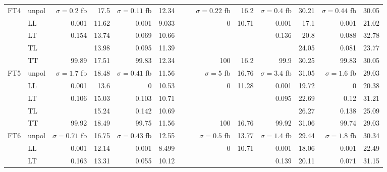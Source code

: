 \begin{table}[h]
{\begin{tabular}{llrrrrrrrrrrrr}
\midrule
\multirow{5}{*}{FT4}
 & unpol & $\sigma = \num{0.2}$ fb & \num{17.5} & $\sigma = \num{0.11}$ fb & \num{12.34} &  &  & $\sigma = \num{0.22}$ fb & \num{16.2} & $\sigma = \num{0.4}$ fb & \num{30.21} & $\sigma = \num{0.44}$ fb & \num{30.05} \\
 & LL & \num{0.001} & \num{11.62} & \num{0.001} & \num{9.033} &  &  & \num{0} & \num{10.71} & \num{0.001} & \num{17.1} & \num{0.001} & \num{21.02} \\
 & LT & \num{0.154} & \num{13.74} & \num{0.069} & \num{10.66} &  &  &  &  & \num{0.136} & \num{20.8} & \num{0.088} & \num{32.78} \\
 & TL &  & \num{13.98} & \num{0.095} & \num{11.39} &  &  &  &  &  & \num{24.05} & \num{0.081} & \num{23.77} \\
 & TT & \num{99.89} & \num{17.51} & \num{99.83} & \num{12.34} &  &  & \num{100} & \num{16.2} & \num{99.9} & \num{30.25} & \num{99.83} & \num{30.05} \\
\midrule
\multirow{5}{*}{FT5}
 & unpol & $\sigma = \num{1.7}$ fb & \num{18.48} & $\sigma = \num{0.41}$ fb & \num{11.56} &  &  & $\sigma = \num{5}$ fb & \num{16.76} & $\sigma = \num{3.4}$ fb & \num{31.05} & $\sigma = \num{1.6}$ fb & \num{29.03} \\
 & LL & \num{0.001} & \num{13.6} & \num{0} & \num{10.53} &  &  & \num{0} & \num{11.28} & \num{0.001} & \num{19.72} & \num{0} & \num{20.38} \\
 & LT & \num{0.106} & \num{15.03} & \num{0.103} & \num{10.71} &  &  &  &  & \num{0.095} & \num{22.69} & \num{0.12} & \num{31.21} \\
 & TL &  & \num{15.24} & \num{0.142} & \num{10.69} &  &  &  &  &  & \num{26.27} & \num{0.138} & \num{25.09} \\
 & TT & \num{99.92} & \num{18.49} & \num{99.75} & \num{11.56} &  &  & \num{100} & \num{16.76} & \num{99.92} & \num{31.06} & \num{99.74} & \num{29.03} \\
\midrule
\multirow{5}{*}{FT6}
 & unpol & $\sigma = \num{0.71}$ fb & \num{16.75} & $\sigma = \num{0.43}$ fb & \num{12.55} &  &  & $\sigma = \num{0.5}$ fb & \num{13.77} & $\sigma = \num{1.4}$ fb & \num{29.44} & $\sigma = \num{1.8}$ fb & \num{30.34} \\
 & LL & \num{0.001} & \num{12.14} & \num{0.001} & \num{8.499} &  &  & \num{0} & \num{10.71} & \num{0.001} & \num{18.06} & \num{0.001} & \num{22.49} \\
 & LT & \num{0.163} & \num{13.31} & \num{0.055} & \num{10.12} &  &  &  &  & \num{0.139} & \num{20.11} & \num{0.071} & \num{31.15} \\

\end{tabular}}
\end{table}
